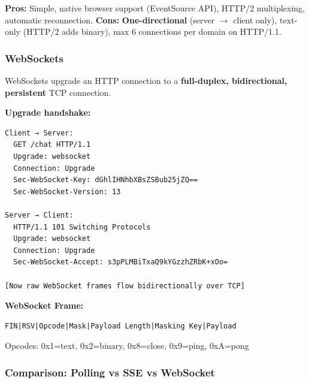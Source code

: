 \documentclass[11pt]{article}
\begin{document}
\textbf{Pros:} Simple, native browser support (EventSource API), HTTP/2 multiplexing, automatic reconnection.
\textbf{Cons:} \textbf{One-directional} (server \(\rightarrow\) client only), text-only (HTTP/2 adds binary), max 6 connections per domain on HTTP/1.1.

\subsubsection{WebSockets}\label{websockets}

WebSockets upgrade an HTTP connection to a \textbf{full-duplex, bidirectional, persistent} TCP connection.

\textbf{Upgrade handshake:}

\setcodelang{}

\begin{verbatim}
Client → Server:
  GET /chat HTTP/1.1
  Upgrade: websocket
  Connection: Upgrade
  Sec-WebSocket-Key: dGhlIHNhbXBsZSBub25jZQ==
  Sec-WebSocket-Version: 13

Server → Client:
  HTTP/1.1 101 Switching Protocols
  Upgrade: websocket
  Connection: Upgrade
  Sec-WebSocket-Accept: s3pPLMBiTxaQ9kYGzzhZRbK+xOo=

[Now raw WebSocket frames flow bidirectionally over TCP]
\end{verbatim}

\textbf{WebSocket Frame:}

\setcodelang{}

\begin{verbatim}
FIN|RSV|Opcode|Mask|Payload Length|Masking Key|Payload
\end{verbatim}

Opcodes: 0x1=text, 0x2=binary, 0x8=close, 0x9=ping, 0xA=pong

\subsubsection{Comparison: Polling vs SSE vs WebSocket}\label{comparison-polling-vs-sse-vs-websocket}
\end{document}
